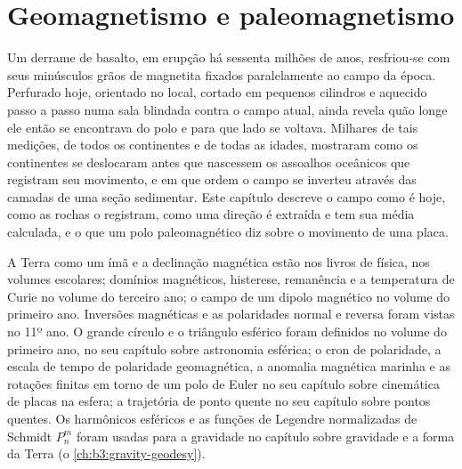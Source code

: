\chapter{Geomagnetismo e paleomagnetismo}\label{ch:b3:palaeomagnetism}

Um derrame de basalto, em erupção há sessenta milhões de anos, resfriou-se com seus minúsculos grãos de
magnetita fixados paralelamente ao campo da época. Perfurado hoje, orientado no
local, cortado em pequenos cilindros e aquecido
passo a passo numa sala blindada contra o campo atual, ainda revela quão longe
ele então se encontrava do polo e para que lado se voltava. Milhares de tais
medições, de todos os continentes e de todas as idades, mostraram como os continentes
se deslocaram antes que nascessem os assoalhos oceânicos que registram seu movimento, e em
que ordem o campo se inverteu através das camadas de uma seção sedimentar.
Este capítulo descreve o campo como é hoje, como as rochas o registram,
como uma direção é extraída e tem sua média calculada, e o que um polo paleomagnético diz
sobre o movimento de uma placa.

\begin{recall}
A Terra como um ímã e a declinação magnética estão nos livros de física,
nos volumes escolares; domínios magnéticos, histerese, remanência e a
temperatura de Curie no volume do terceiro ano; o campo de um dipolo magnético no
volume do primeiro ano. Inversões magnéticas e as polaridades normal e reversa foram
vistas no 11º ano. O grande círculo e o triângulo esférico foram definidos no
volume do primeiro ano, no seu capítulo sobre astronomia esférica; o cron de polaridade,
a escala de tempo de polaridade geomagnética, a anomalia magnética marinha e as rotações finitas
em torno de um polo de Euler no seu capítulo sobre cinemática de placas na esfera;
a trajetória de ponto quente no seu capítulo sobre pontos quentes. Os harmônicos esféricos e as
funções de Legendre normalizadas de Schmidt $P_n^m$ foram usadas para a gravidade no
capítulo sobre gravidade e a forma da Terra (o \cref{ch:b3:gravity-geodesy}).
\end{recall}

